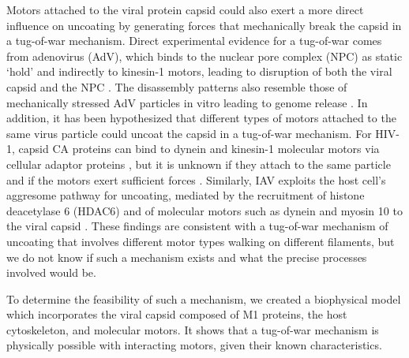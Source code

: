 Motors attached to the viral protein capsid could also exert a more direct influence on uncoating by generating forces that mechanically break the capsid in a tug-of-war mechanism. Direct experimental evidence for a tug-of-war comes from adenovirus (AdV), which binds to the nuclear pore complex (NPC) as static ‘hold’ and indirectly to kinesin-1 motors, leading to disruption of both the viral capsid and the NPC \cite{greber2019adenovirus, strunze2011kinesin}. The disassembly patterns also resemble those of mechanically stressed AdV particles in vitro leading to genome release \cite{ortega2015fluorescence, ortega2013monitoring}. In addition, it has been hypothesized that different types of motors attached to the same virus particle could uncoat the capsid in a tug-of-war mechanism. For HIV-1, capsid CA proteins can bind to dynein and kinesin-1 molecular motors via cellular adaptor proteins \cite{carnes2018hiv, lukic2014hiv, malikov2017localized}, but it is unknown if they attach to the same particle and if the motors exert sufficient forces \cite{malikov2017localized}. Similarly, IAV exploits the host cell’s aggresome pathway for uncoating, mediated by the recruitment of histone deacetylase 6 (HDAC6) and of molecular motors such as dynein and myosin 10 to the viral capsid \cite{banerjee2014influenza}. These findings are consistent with a tug-of-war mechanism of uncoating that involves different motor types walking on different filaments, but we do not know if such a mechanism exists and what the precise processes involved would be.

To determine the feasibility of such a mechanism, we created a biophysical model which incorporates the viral capsid composed of M1 proteins, the host cytoskeleton, and molecular motors. It shows that a tug-of-war mechanism is physically possible with interacting motors, given their known characteristics.